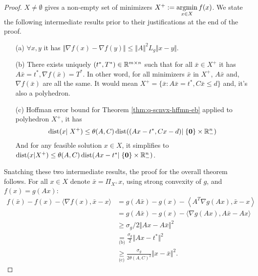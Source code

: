 \documentclass[12pt]{report}
\begin{document}
            \begin{proof}
                $X\neq \emptyset$ gives a non-empty set of minimizers $X^+ := \mathop{\rm argmin}\limits_{x \in X} f(x)$. 
                We state the following intermediate results prior to their justifications at the end of the proof. 
                \begin{enumerate}
                    \item [(a)] $\forall x, y$ it has $\Vert \nabla f(x) - \nabla f(y)\Vert \le \Vert A\Vert^2 L_g \Vert x - y\Vert$. 
                    \item [(b)] There exists uniquely $(t^*, T^*) \in \mathbb R^{m\times n}$ such that for all $\bar x \in X^+$ it has $A\bar x = t^*, \nabla f(\bar x) = T^*$. In other word, for all minimizers $\bar x$ in $X^+$, $A\bar x$ and, $\nabla f(\bar x)$ are all the same. It would mean $X^+ = \{\bar x : A\bar x = t^*, C\bar x \le d\}$ and, it's also a polyhedron. 
                    \item [(c)] Hoffman error bound for Theorem \ref{thm:q-scnvx-hffmn-eb} applied to polyhedron $X^+$, it has 
                    \begin{align*}
                        \operatorname{dist}(x |\; X^+) \le \theta(A, C)\operatorname{dist}((Ax - t^*, Cx - d) |\; \{\mathbf 0\}\times \mathbb R^n_-)
                    \end{align*}
                    And for any feasible solution $x \in X$, it simplifies to $\operatorname{dist}(x | X^+) \le \theta(A, C) \operatorname{dist}(Ax - t^* |\; \{\mathbf 0\}\times \mathbb R^n_-)$. 
                \end{enumerate}
                Snatching these two intermediate results, the proof for the overall theorem follows. 
                For all $x \in X$ denote $\bar x = \Pi_{X^+} x$, using strong convexity of $g$, and $f(x) = g(Ax)$: 
                \begin{align*}
                    f(\bar x) - f(x) - \langle \nabla f(x), \bar x - x\rangle &= 
                    g(A\bar x) - g(x) - \left\langle A^T\nabla g(Ax), \bar x - x\right\rangle
                    \\
                    &= g(A\bar x) - g(x) - \langle \nabla g(Ax), A\bar x - Ax\rangle
                    \\
                    &\ge \sigma_g/2\Vert Ax - A\bar x\Vert^2 
                    \\
                    &\underset{\text{(b)}}{=} \frac{\sigma_g}{2} \Vert Ax - t^*\Vert^2 
                    \\
                    &\underset{\text{(c)}}{\ge} \frac{\sigma_g}{2\theta(A, C)^2} \Vert x - \bar x\Vert^2. 

\end{align*}
\end{proof}
\end{document}
